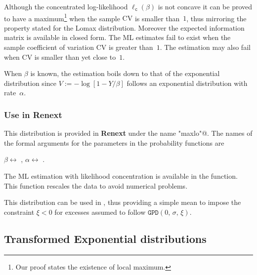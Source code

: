 \documentclass[a4paper]{report}
\newcommand{\pkg}[1]{\textbf{#1}}
\begin{document}
Although  the concentrated
log-likelihood $\ell_{\texttt{c}}(\beta)$ is not concave it can be
proved to have a maximum\footnote{Our proof states the existence of
  local maximum.} when the sample $\textrm{CV}$ is smaller than~$1$,
thus mirroring the property stated for the Lomax distribution.
Moreover the expected information matrix is available in closed form.
The ML estimates fail to exist when the sample coefficient of
variation $\textrm{CV}$ is greater than~$1$. The estimation may also
fail when $\textrm{CV}$ is smaller than yet close to~$1$.
%



When $\beta$ is known, the estimation boils down to that of the 
exponential distribution since $V:= -\log[1 - Y/\beta]$ follows
an exponential distribution with rate~$\alpha$.



\subsubsection*{Use in Renext}
This distribution is provided in \pkg{Renext} under the name \verb@"maxlo"@. The
names of the formal arguments for the parameters in the probability functions are
\begin{center}
  $\beta \leftrightarrow$ \verb@scale@, \qquad
  $\alpha \leftrightarrow$ \verb@shape@. 
\end{center}
The ML estimation with likelihood concentration 
is available in the \verb@fmaxlo@ function.
This function rescales the 
data to avoid numerical problems.

This distribution can be used in \verb@Renouv@, thus providing a simple
mean to impose the constraint $\xi<0$ for excesses assumed to
follow $\texttt{GPD}(0,\,\sigma,\,\xi)$. 




\subsection{Transformed Exponential distributions}
\label{TRANSEXP}
\end{document}
